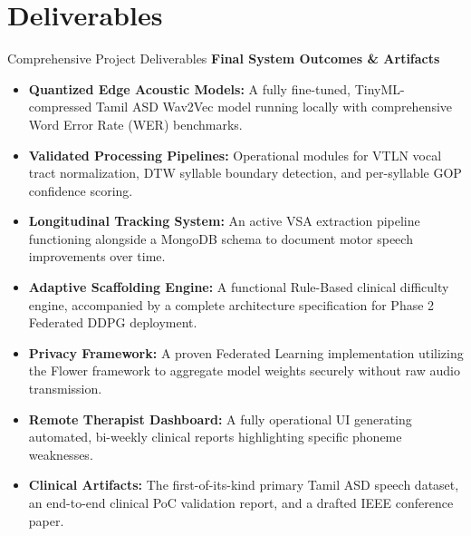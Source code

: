\documentclass[aspectratio=169, 11pt, xcolor=table]{beamer}
\begin{document}
\section{Deliverables}
\begin{frame}{Comprehensive Project Deliverables}
    \vspace{-2mm}
    {\large \textbf{\textcolor{amritaMaroon}{Final System Outcomes \& Artifacts}}}\\
    \vspace{2mm}
    \footnotesize
    \begin{itemize}
        \setlength{\itemsep}{4pt}
        \item \textbf{Quantized Edge Acoustic Models:} A fully fine-tuned, TinyML-compressed Tamil ASD Wav2Vec model running locally with comprehensive Word Error Rate (WER) benchmarks.
        \item \textbf{Validated Processing Pipelines:} Operational modules for VTLN vocal tract normalization, DTW syllable boundary detection, and per-syllable GOP confidence scoring.
        \item \textbf{Longitudinal Tracking System:} An active VSA extraction pipeline functioning alongside a MongoDB schema to document motor speech improvements over time.
        \item \textbf{Adaptive Scaffolding Engine:} A functional Rule-Based clinical difficulty engine, accompanied by a complete architecture specification for Phase 2 Federated DDPG deployment.
        \item \textbf{Privacy Framework:} A proven Federated Learning implementation utilizing the Flower framework to aggregate model weights securely without raw audio transmission.
        \item \textbf{Remote Therapist Dashboard:} A fully operational UI generating automated, bi-weekly clinical reports highlighting specific phoneme weaknesses.
        \item \textbf{Clinical Artifacts:} The first-of-its-kind primary Tamil ASD speech dataset, an end-to-end clinical PoC validation report, and a drafted IEEE conference paper.
    \end{itemize}
\end{frame}
\end{document}
